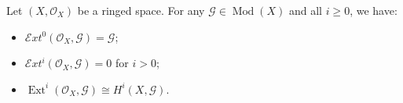 Let $(X,\mathcal{O}_X)$ be a ringed space. For any $\mathcal{G} \in \operatorname{Mod}(X)$ and all $i \geqslant 0$, we have:
\begin{itemize}
\item[(a)] $\mathcal{E}xt^0(\mathcal{O}_X,\mathcal{G}) = \mathcal{G}$;
\item[(b)] $\mathcal{E}xt^i(\mathcal{O}_X,\mathcal{G}) = 0$ for $i > 0$;
\item[(c)] $\operatorname{Ext}^i(\mathcal{O}_X,\mathcal{G}) \cong H^i(X,\mathcal{G})$.
\end{itemize}
